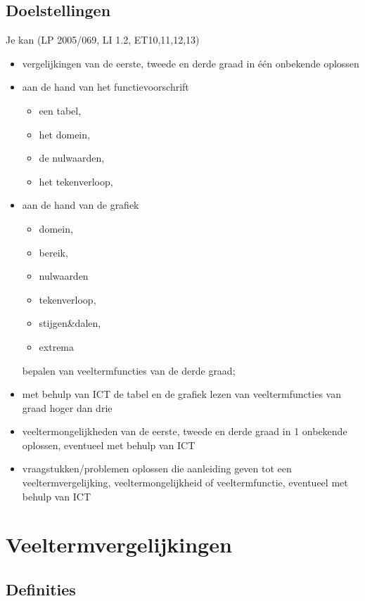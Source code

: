 \documentclass[12pt,twoside,a4paper]{article}
\begin{document}
\subsection*{Doelstellingen}
{\singlespacing
  Je kan \hfill  {\scriptsize(LP 2005/069, LI 1.2, ET10,11,12,13)}
  \begin{itemize}
  \item vergelijkingen van de eerste, tweede en derde graad in één onbekende oplossen
  \item aan de hand van het functievoorschrift
    \begin{itemize}
    \item een tabel,
    \item het domein,
    \item de nulwaarden,
    \item het tekenverloop,
    \end{itemize}
  \item aan de hand van de grafiek
    \begin{itemize}
    \item domein,
    \item bereik,
    \item nulwaarden
    \item tekenverloop,
    \item stijgen\&dalen,
    \item extrema
    \end{itemize}
    bepalen van veeltermfuncties van de derde graad;
  \item met behulp van ICT de tabel en de grafiek lezen van veeltermfuncties van graad hoger dan drie
  \item veeltermongelijkheden van de eerste, tweede en derde graad in 1 onbekende oplossen, eventueel met behulp van ICT
  \item vraagstukken/problemen oplossen die aanleiding geven tot een veeltermvergelijking, veeltermongelijkheid of veeltermfunctie, eventueel met behulp van ICT
  \end{itemize}
}

\newpage
\thispagestyle{empty}
\tableofcontents


\newpage
{}

\section{Veeltermvergelijkingen}

\subsection{Definities}
\end{document}
